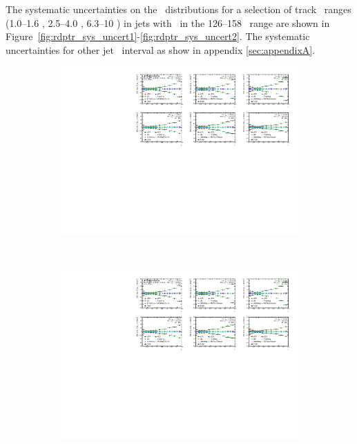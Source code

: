 The systematic uncertainties on the \Rdptr\ distributions for a selection of track \pt\ ranges (1.0--1.6 \GeV, 2.5--4.0 \GeV, 6.3--10 \GeV) in jets with \pt\ in the 126--158 \GeV\ range are shown in Figure~\ref{fig:rdptr_sys_uncert1}-\ref{fig:rdptr_sys_uncert2}. The systematic uncertainties for other jet \pT\ interval as show in appendix \ref{sec:appendixA}. 

\begin{figure}
\centering
\begin{subfigure}[b]{\textwidth}
    \centering
    \includegraphics[page=1, width=\textwidth]{figures/main/systematics/Summary_ChPS_dR_sys_PbPb_error}
    \caption{}
    \label{fig:rdptr_sys_uncert1a}
\end{subfigure} \\
\begin{subfigure}[b]{\textwidth}
    \centering
    \includegraphics[page=3, width=\textwidth]{figures/main/systematics/Summary_ChPS_dR_sys_PbPb_error}

\end{subfigure}
\end{figure}
